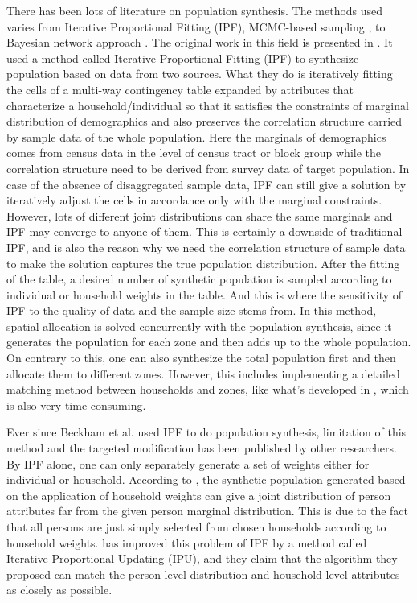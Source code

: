 \documentclass{article}
\begin{document}
There has been lots of literature on population synthesis.
The methods used varies from Iterative Proportional Fitting (IPF), MCMC-based sampling \cite{farooq2013simulation}, to Bayesian network approach \cite{sun2015bayesian}. The original work in this field is presented in \cite{beckman1996creating}. It used a method called Iterative Proportional Fitting (IPF) to synthesize population based on data from two sources. What they do is iteratively fitting the cells of a multi-way contingency table expanded by attributes that characterize a household/individual so that it satisfies the constraints of marginal distribution of demographics and also preserves the correlation structure carried by sample data of the whole population. Here the marginals of demographics comes from census data in the level of census tract or block group while the correlation structure need to be derived from survey data of target population. In case of the absence of disaggregated sample data, IPF can still give a solution by iteratively adjust the cells in accordance only with the marginal constraints. However, lots of different joint distributions can share the same marginals and IPF may converge to anyone of them. This is certainly a downside of traditional IPF, and is also the reason why we need the correlation structure of sample data to make the solution captures the true population distribution. After the fitting of the table, a desired number of synthetic population is sampled according to individual or household weights in the table. And this is where the sensitivity of IPF to the quality of data and the sample size stems from. In this method, spatial allocation is solved concurrently with the population synthesis, since it generates the population for each zone and then adds up to the whole population. On contrary to this, one can also synthesize the total population first and then allocate them to different zones. However, this includes implementing a detailed matching method between households and zones, like what's developed in \cite{ge2014virtual}, which is also very time-consuming. 

Ever since Beckham et al. used IPF to do population synthesis, limitation of this method and the targeted modification has been published by other researchers. By IPF alone, one can only separately generate a set of weights either for individual or household. According to \cite{ye2009methodology}, the synthetic population generated based on the application of household weights can give a joint distribution of person attributes far from the given person marginal distribution.
This is due to the fact that all persons are just simply selected from chosen households according to household weights.
\textcite{ye2009methodology} has improved this problem of IPF by a method called Iterative Proportional Updating (IPU), and they claim that the algorithm they proposed can match the person-level distribution and household-level attributes as closely as possible. \\
\end{document}
